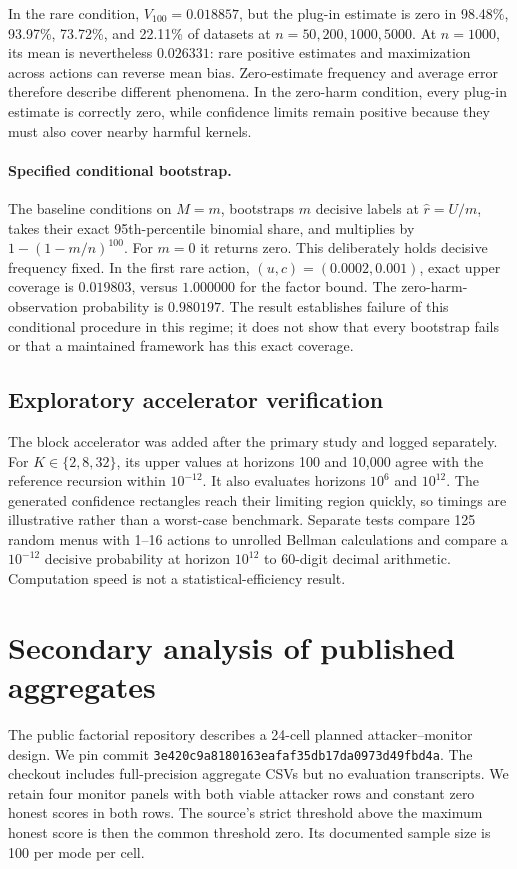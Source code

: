 \documentclass[10pt]{article}
\begin{document}
In the rare condition, $V_{100}=0.018857$, but the plug-in estimate is zero in 98.48\%, 93.97\%, 73.72\%, and 22.11\% of datasets at $n=50,200,1000,5000$. At $n=1000$, its mean is nevertheless $0.026331$: rare positive estimates and maximization across actions can reverse mean bias. Zero-estimate frequency and average error therefore describe different phenomena. In the zero-harm condition, every plug-in estimate is correctly zero, while confidence limits remain positive because they must also cover nearby harmful kernels.

\paragraph{Specified conditional bootstrap.}
The baseline conditions on $M=m$, bootstraps $m$ decisive labels at $\widehat r=U/m$, takes their exact 95th-percentile binomial share, and multiplies by $1-(1-m/n)^{100}$. For $m=0$ it returns zero. This deliberately holds decisive frequency fixed. In the first rare action, $(u,c)=(0.0002,0.001)$, exact upper coverage is $0.019803$, versus $1.000000$ for the factor bound. The zero-harm-observation probability is $0.980197$. The result establishes failure of this conditional procedure in this regime; it does not show that every bootstrap fails or that a maintained framework has this exact coverage.

\subsection{Exploratory accelerator verification}
The block accelerator was added after the primary study and logged separately. For $K\in\{2,8,32\}$, its upper values at horizons 100 and 10,000 agree with the reference recursion within $10^{-12}$. It also evaluates horizons $10^6$ and $10^{12}$. The generated confidence rectangles reach their limiting region quickly, so timings are illustrative rather than a worst-case benchmark. Separate tests compare 125 random menus with 1--16 actions to unrolled Bellman calculations and compare a $10^{-12}$ decisive probability at horizon $10^{12}$ to 60-digit decimal arithmetic. Computation speed is not a statistical-efficiency result.

\section{Secondary analysis of published aggregates}\label{sec:public}
The public factorial repository \citep{williams} describes a 24-cell planned attacker--monitor design. We pin commit \texttt{3e420c9a8180163eafaf35db17da0973d49fbd4a}. The checkout includes full-precision aggregate CSVs but no evaluation transcripts. We retain four monitor panels with both viable attacker rows and constant zero honest scores in both rows. The source's strict threshold above the maximum honest score is then the common threshold zero. Its documented sample size is 100 per mode per cell.
\end{document}
